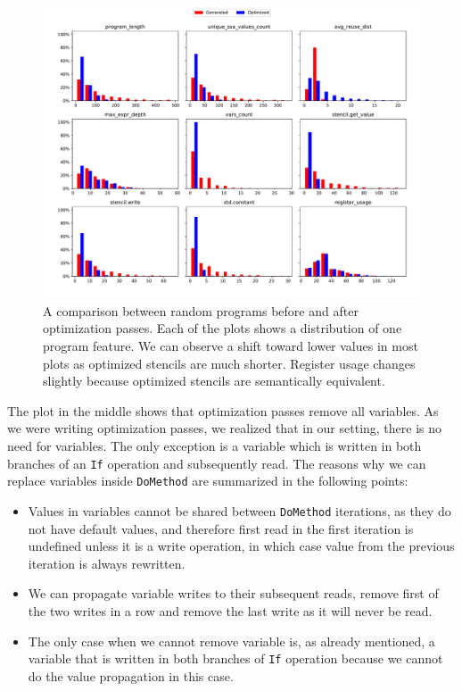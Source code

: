 \documentclass[sigplan,\review anonymous]{acmart}
\begin{document}
\begin{figure}
  \centering
  \includegraphics[width=\columnwidth]{images/gen_vs_dced_top_features.pdf}
  \caption{A comparison between random programs before and after optimization
  passes. Each of the plots shows a distribution of one program feature. We
  can observe a shift toward lower values in most plots as optimized stencils
  are much shorter. Register usage changes slightly because optimized
  stencils are semantically equivalent.}
  \label{fig:gen_vs_dced_top_features}
\end{figure}

The plot in the middle shows that optimization passes remove all variables.
As we were writing optimization passes, we realized that in our setting,
there is no need for variables. The only exception is a variable which is
written in both branches of an \texttt{If} operation and subsequently read.
The reasons why we can replace variables inside \texttt{DoMethod} are
summarized in the following points:
\begin{itemize}
  \item Values in variables cannot be shared between \texttt{DoMethod}
  iterations, as they do not have default values, and therefore first
  read in the first iteration is undefined unless it is a write operation,
  in which case value from the previous iteration is always rewritten.
  \item We can propagate variable writes to their subsequent reads,
  remove first of the two writes in a row and remove the last write as
  it will never be read.
  \item The only case when we cannot remove variable is, as already
  mentioned, a variable that is written in both branches of \texttt{If}
  operation because we cannot do the value propagation in this case.
\end{itemize}
\end{document}
